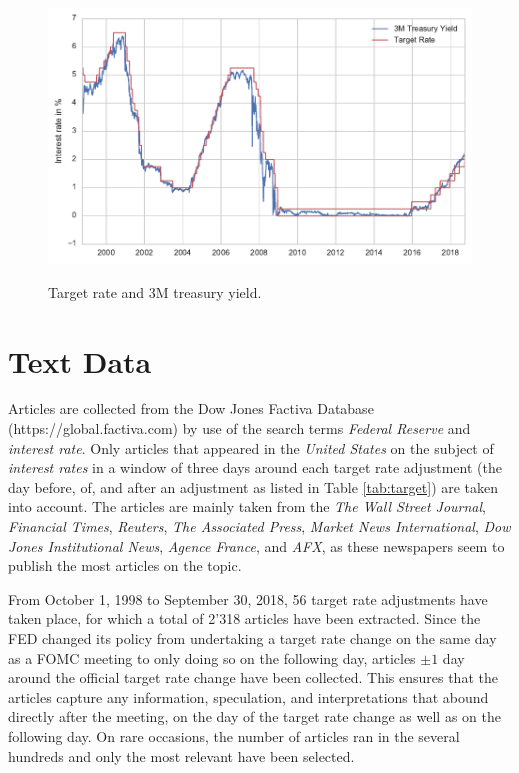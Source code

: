 \documentclass[11pt,a4paper,english,oneside]{book}
\numberwithin{equation}{chapter}
\begin{document}
\begin{figure}
	\caption{Target rate and 3M treasury yield.}
	\centering
	\includegraphics[scale=1]{Images/3Mtreasury.pdf}
	\label{3Mtreasury}
\end{figure}

\section{Text Data}

Articles are collected from the Dow Jones Factiva Database (https://global.factiva.com) by use of the search terms \textit{Federal Reserve} and \textit{interest rate}. Only articles that appeared in the \textit{United States} on the subject of \textit{interest rates} in a window of three days around each target rate adjustment (the day before, of, and after an adjustment as listed in Table \ref{tab:target}) are taken into account. The articles are mainly taken from the \textit{The Wall Street Journal}, \textit{Financial Times}, \textit{Reuters}, \textit{The Associated Press}, \textit{Market News International}, \textit{Dow Jones Institutional News}, \textit{Agence France}, and \textit{AFX}, as these newspapers seem to publish the most articles on the topic. 

From October 1, 1998 to September 30, 2018, 56 target rate adjustments have taken place, for which a total of 2'318 articles have been extracted. Since the FED changed its policy from undertaking a target rate change on the same day as a FOMC meeting to only doing so on the following day, articles $\pm1$ day around the official target rate change have been collected. This ensures that the articles capture any information, speculation, and interpretations that abound directly after the meeting, on the day of the target rate change as well as on the following day. On rare occasions, the number of articles ran in the several hundreds and only the most relevant have been selected. 
\end{document}
